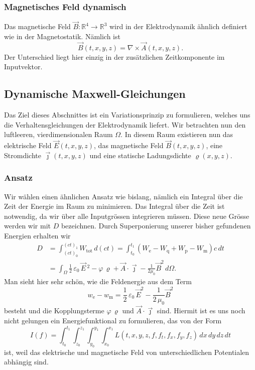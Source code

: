 \subsubsection{Magnetisches Feld dynamisch}
Das magnetische Feld
\(
\vec{B}: \mathbb{R}^4 \rightarrow \mathbb{R}^3
\)
wird in der Elektrodynamik ähnlich definiert wie in der Magnetostatik. Nämlich ist
\begin{equation}
	\vec{B}(t,x,y,z)
	=
	\nabla \times \vec{A}(t,x,y,z).
	\label{maxwell:section:definition_dynamisch_magnetischesFeld}
\end{equation}
Der Unterschied liegt hier einzig in der zusätzlichen Zeitkomponente im Inputvektor.

\subsection{Dynamische Maxwell-Gleichungen}
Das Ziel dieses Abschnittes ist ein Variationsprinzip zu formulieren, welches uns die Verhaltensgleichungen der Elektrodynamik liefert. 
Wir betrachten nun den luftleeren, vierdimensionalen Raum $\Omega$.
In diesem Raum existieren nun das elektrische Feld $\vec{E}(t,x,y,z)$, das magnetische Feld $\vec{B}(t,x,y,z)$, eine Stromdichte $\vec{\jmath}(t,x,y,z)$ und eine statische Ladungsdichte $\varrho(x,y,z)$.

\subsubsection{Ansatz}
Wir wählen einen ähnlichen Ansatz wie bislang, nämlich ein Integral über die Zeit der Energie im Raum zu minimieren.
Das Integral über die Zeit ist notwendig, da wir über alle Inputgrössen integrieren müssen.
Diese neue Grösse werden wir mit $D$ bezeichnen.
Durch Superponierung unserer bisher gefundenen Energien erhalten wir
\begin{align*}
	D
	&=
	\int_{(ct)_0}^{(ct)_1} W_{\text{tot}}\,d(ct)
	=
	\int_{t_0}^{t_1} \left(W_{\text{e}} - W_{\text{q}} + W_{\text{p}} - W_{\text{m}}\right)c\,dt
	\\
	&= \int_{\Omega} \frac{1}{2}\,\varepsilon_0\,\vec{E}\,^2 - \varphi\,\varrho 
	+ \vec{A}\cdot\vec{\jmath} - \frac{1}{2\mu_0}\vec{B}^2 \,d\Omega.
\end{align*}
Man sieht hier sehr schön, wie die Feldenergie aus dem Term
\[
w_{\text{e}} - w_{\text{m}}
=
\frac{1}{2}\,\varepsilon_0\,\vec{E}^2 - \frac{1}{2\,\mu_0}\vec{B}^2
\]
besteht und die Kopplungsterme 
\(
\varphi\,\varrho
\)
und
\(
\vec{A}\cdot\vec{\jmath}
\)
sind.
Hiermit ist es uns noch nicht gelungen ein Energiefunktional zu formulieren, das von der Form
\[
I(f) = \int_{t_0}^{t_1} \int_{z_0}^{z_1} \int_{y_0}^{y_1} \int_{x_0}^{x_1} L(t,x,y,z,f,f_t,f_x,f_y,f_z)\,dx\,dy\,dz\,dt 
\]
ist, weil das elektrische und magnetische Feld von unterschiedlichen Potentialen abhängig sind.

